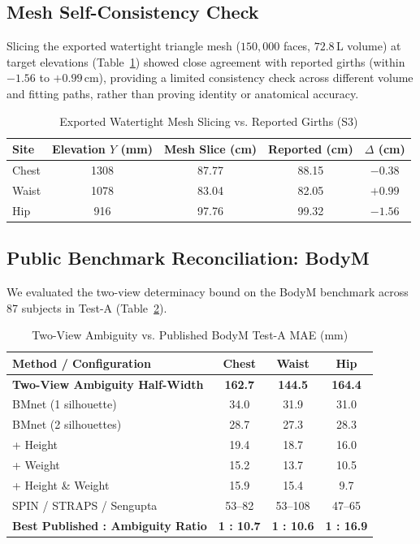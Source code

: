 \documentclass[journal]{IEEEtran}
\begin{document}
\subsection{Mesh Self-Consistency Check}
Slicing the exported watertight triangle mesh ($150,000$ faces, $72.8$\,L volume) at target elevations (Table~\ref{tab:mesh_slice}) showed close agreement with reported girths (within $-1.56$ to $+0.99$\,cm), providing a limited consistency check across different volume and fitting paths, rather than proving identity or anatomical accuracy.

\begin{table}[!t]
\caption{Exported Watertight Mesh Slicing vs. Reported Girths (S3)}
\label{tab:mesh_slice}
\centering
\begin{tabular}{lcccc}
\toprule
\textbf{Site} & \textbf{Elevation $Y$ (mm)} & \textbf{Mesh Slice (cm)} & \textbf{Reported (cm)} & $\Delta$ (cm) \\
\midrule
Chest & 1308 & 87.77 & 88.15 & $-0.38$ \\
Waist & 1078 & 83.04 & 82.05 & $+0.99$ \\
Hip & 916 & 97.76 & 99.32 & $-1.56$ \\
\bottomrule
\end{tabular}
\end{table}

\subsection{Public Benchmark Reconciliation: BodyM}
We evaluated the two-view determinacy bound on the BodyM benchmark \cite{ruiz2022bodym} across 87 subjects in Test-A (Table~\ref{tab:bodym_comparison}).

\begin{table}[!t]
\caption{Two-View Ambiguity vs. Published BodyM Test-A MAE (mm)}
\label{tab:bodym_comparison}
\centering
\begin{tabular}{lccc}
\toprule
\textbf{Method / Configuration} & \textbf{Chest} & \textbf{Waist} & \textbf{Hip} \\
\midrule
\textbf{Two-View Ambiguity Half-Width} & \textbf{162.7} & \textbf{144.5} & \textbf{164.4} \\
\midrule
BMnet (1 silhouette) \cite{ruiz2022bodym} & 34.0 & 31.9 & 31.0 \\
BMnet (2 silhouettes) \cite{ruiz2022bodym} & 28.7 & 27.3 & 28.3 \\
\quad + Height & 19.4 & 18.7 & 16.0 \\
\quad + Weight & 15.2 & 13.7 & 10.5 \\
\quad + Height \& Weight & 15.9 & 15.4 & 9.7 \\
\midrule
SPIN / STRAPS / Sengupta \cite{ruiz2022bodym} & 53--82 & 53--108 & 47--65 \\
\midrule
\textbf{Best Published : Ambiguity Ratio} & \textbf{1 : 10.7} & \textbf{1 : 10.6} & \textbf{1 : 16.9} \\
\bottomrule
\end{tabular}
\end{table}
\end{document}

